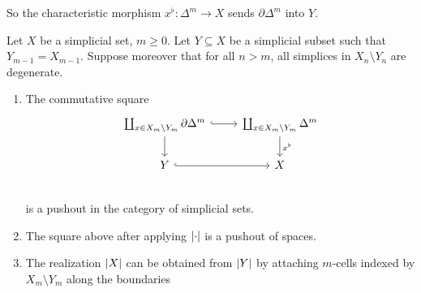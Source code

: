 \documentclass[language=english]{TemplateLecture}
\begin{document}
So the characteristic morphism \(x^\flat \colon \Delta^m \to X\) sends \(\partial \Delta^m\) into \(Y\).

\begin{proposition}
    Let \(X\) be a simplicial set, \(m \geq 0\). Let \(Y \subseteq X\) be a simplicial subset such that \(Y_{m-1} = X_{m-1}\). Suppose moreover that for all \(n > m\), all simplices in \(X_n \setminus Y_n\) are degenerate.
    \begin{enumerate}
        \item The commutative square
        \[\begin{tikzcd}
            \coprod_{x\in X_m \setminus Y_m} \partial \Delta^m \ar[r, hook]\ar[d] & \coprod_{x \in X_m\setminus Y_m} \Delta^m \ar[d, "x^\flat"] \\
            Y\ar[r, hook] & X \\
        \end{tikzcd}\]
        is a pushout in the category of simplicial sets.
        \item The square above after applying \(\lvert\cdot\rvert\) is a pushout of spaces.
        \item The realization \(\lvert X\rvert\) can be obtained from \(\lvert Y\rvert\) by attaching \(m\)-cells indexed by \(X_m\setminus Y_m\) along the boundaries
    \end{enumerate}
\end{proposition}
\end{document}
